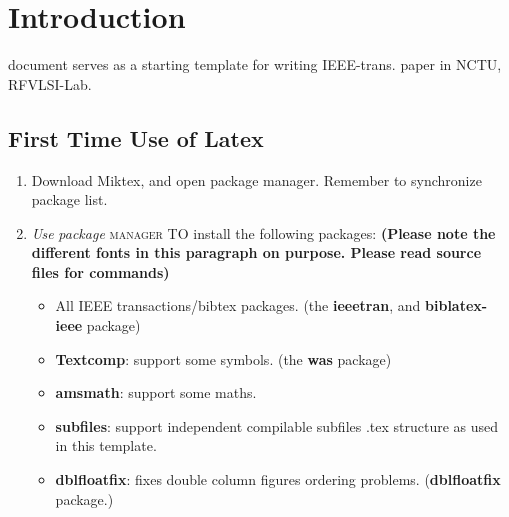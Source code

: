 \documentclass[rfvlsi_template_jrnl.tex]{subfiles}
\begin{document}
\section{Introduction}
% 
% 
% 
% 


 document serves as a starting template for writing IEEE-trans. paper in NCTU, RFVLSI-Lab.

\subsection{First Time Use of Latex}

\begin{enumerate}
  \item Download Miktex, and open package manager. Remember to synchronize package list. 
  \item \textit{Use} \emph{package} \textsc{manager} \uppercase{to} install the following packages: \textbf{(Please note the different fonts in this paragraph on purpose. Please read source files for commands)}
	\begin{itemize}
		\item All IEEE transactions/bibtex packages. (the \textbf{ieeetran}, and \textbf{biblatex-ieee} package)
		\item \textbf{Textcomp}: support some symbols. (the \textbf{was} package)
		\item \textbf{amsmath}: support some maths. 
		\item \textbf{subfiles}: support independent compilable subfiles .tex structure as used in this template. 
		\item \textbf{dblfloatfix}: fixes double column figures ordering problems. (\textbf{dblfloatfix} package.)
	\end{itemize}
\end{enumerate}
\end{document}
